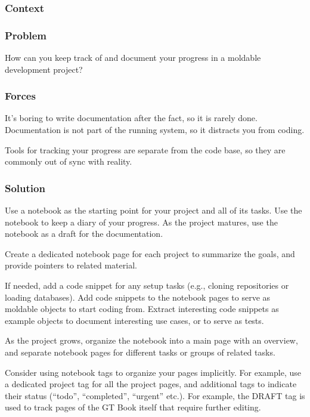 \documentclass[sigconf]{acmart}
\begin{document}
\subsubsection*{Context}

\subsubsection*{Problem}

How can you keep track of and document your progress in a moldable development project?

\subsubsection*{Forces}

It's boring to write documentation after the fact, so it is rarely done. Documentation is not part of the running system, so it distracts you from coding.

Tools for tracking your progress are separate from the code base, so they are commonly out of sync with reality.

\subsubsection*{Solution}

Use a notebook as the starting point for your project and all of its tasks. Use the notebook to keep a diary of your progress. As the project matures, use the notebook as a draft for the documentation.

Create a dedicated notebook page for each project to summarize the goals, and provide pointers to related material.

If needed, add a code snippet for any setup tasks (e.g., cloning repositories or loading databases). Add code snippets to the notebook pages to serve as moldable objects to start coding from. Extract interesting code snippets as example objects to document interesting use cases, or to serve as tests.

As the project grows, organize the notebook into a main page with an overview, and separate notebook pages for different tasks or groups of related tasks.

Consider using notebook tags to organize your pages implicitly. For example, use a dedicated project tag for all the project pages, and additional tags to indicate their status (``todo'', ``completed'', ``urgent'' etc.). For example, the DRAFT tag is used to track pages of the GT Book itself that require further editing.
\end{document}
